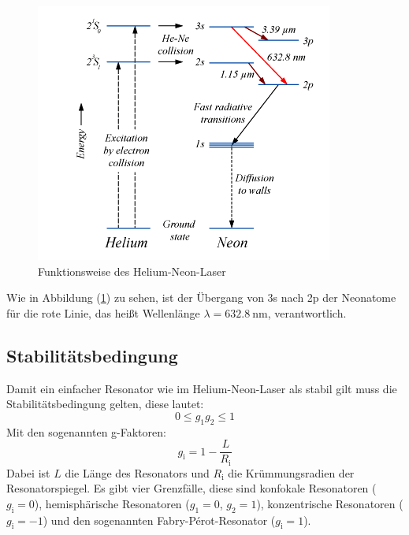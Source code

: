 \begin{figure}[h!]
  \centering
  \includegraphics[scale=0.7]{fig/heliumneon.png}
  \caption{Funktionsweise des Helium-Neon-Laser \cite{Anleitung5}}
  \label{fig:heliumneon}
\end{figure}
Wie in Abbildung (\ref{fig:heliumneon}) zu sehen, ist der Übergang von 3s nach 2p der Neonatome für die rote Linie, das heißt Wellenlänge $\lambda=\SI{632.8}{\nano\meter}$, verantwortlich.
\subsection{Stabilitätsbedingung}
Damit ein einfacher Resonator wie im Helium-Neon-Laser als stabil gilt muss die Stabilitätsbedingung gelten, diese lautet:
\begin{equation}
  \label{eqn:stabi}
  0\leq g_\mathrm{1}g_\mathrm{2}\leq1
\end{equation}
Mit den sogenannten g-Faktoren:
\begin{equation}
  \label{eqn:g-faktor}
  g_\mathrm{i}=1-\dfrac{L}{R_\mathrm{i}}
\end{equation}
Dabei ist $L$ die Länge des Resonators und $R_\mathrm{i}$ die Krümmungsradien der Resonatorspiegel. Es gibt vier Grenzfälle, diese sind konfokale Resonatoren ($g_\mathrm{i}=0$), hemisphärische Resonatoren ($g_\mathrm{1}=0$, $g_\mathrm{2}=1$), konzentrische Resonatoren ($g_\mathrm{i}=-1$) und den sogenannten Fabry-Pérot-Resonator ($g_\mathrm{i}=1$).
